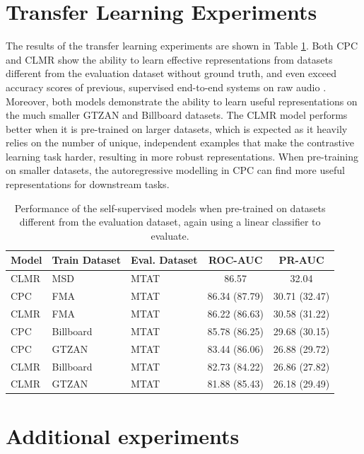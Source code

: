 \section{Transfer Learning Experiments}
The results of the transfer learning experiments are shown in Table \ref{tab:magnatagatune_results}.
Both CPC and CLMR show the ability to learn effective representations from datasets different from the evaluation dataset without ground truth, and even exceed accuracy scores of previous, supervised end-to-end systems on raw audio \cite{dieleman2014end}.
Moreover, both models demonstrate the ability to learn useful representations on the much smaller GTZAN and Billboard datasets.
The CLMR model performs better when it is pre-trained on larger datasets, which is expected as it heavily relies on the number of unique, independent examples that make the contrastive learning task harder, resulting in more robust representations.
When pre-training on smaller datasets, the autoregressive modelling in CPC can find more useful representations for downstream tasks.

\begin{table}[h]
    \centering
    \begin{tabular}{@{}lllcc@{}}\toprule
        Model & Train Dataset & Eval.
        Dataset &  ROC-AUC & PR-AUC \\ \midrule
        CLMR & MSD & MTAT &  86.57 & 32.04 \\
        CPC & FMA & MTAT & 86.34 (87.79) & 30.71 (32.47) \\
        CLMR & FMA & MTAT & 86.22 (86.63) & 30.58 (31.22) \\
        CPC & Billboard & MTAT & 85.78 (86.25) & 29.68 (30.15) \\
        CPC & GTZAN & MTAT & 83.44 (86.06) & 26.88 (29.72) \\
        CLMR & Billboard & MTAT & 82.73 (84.22) & 26.86 (27.82) \\
        CLMR & GTZAN & MTAT & 81.88 (85.43) & 26.18 (29.49) \\
        \bottomrule
    \end{tabular}
    \caption{Performance of the self-supervised models when pre-trained on datasets different from the evaluation dataset, again using a linear classifier to evaluate.}
    \label{tab:magnatagatune_results}
\end{table}

\newpage

\section{Additional experiments}\label{sec:additional_experiments}
